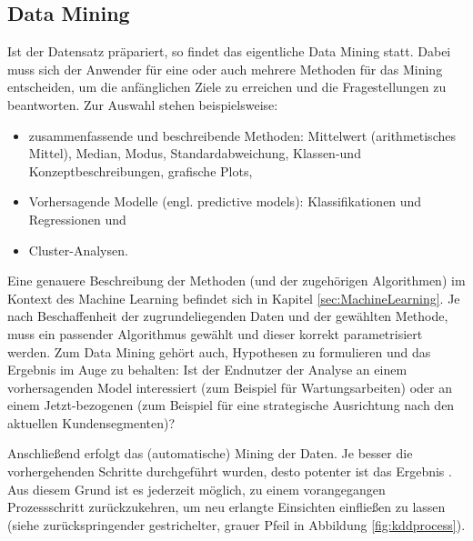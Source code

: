 \subsection{Data Mining}\label{subsubsec:DataMining}
Ist der Datensatz präpariert, so findet das eigentliche Data Mining statt. Dabei muss sich der Anwender für eine oder auch mehrere Methoden für das Mining entscheiden, um die anfänglichen Ziele zu erreichen und die Fragestellungen zu beantworten. Zur Auswahl stehen beispielsweise:
\begin{itemize}
\item zusammenfassende und beschreibende Methoden: Mittelwert (arithmetisches Mittel), Median, Modus, Standardabweichung, Klassen-und Konzeptbeschreibungen, grafische Plots,
\item Vorhersagende Modelle (engl. predictive models): Klassifikationen und Regressionen und
\item Cluster-Analysen.
\end{itemize}
Eine genauere Beschreibung der Methoden (und der zugehörigen Algorithmen) im Kontext des Machine Learning befindet sich in Kapitel \ref{sec:MachineLearning}. Je nach Beschaffenheit der zugrundeliegenden Daten und der gewählten Methode, muss ein passender Algorithmus gewählt und dieser korrekt parametrisiert werden. Zum Data Mining gehört auch, Hypothesen zu formulieren und das Ergebnis im Auge zu behalten: Ist der Endnutzer der Analyse an einem vorhersagenden Model interessiert (zum Beispiel für Wartungsarbeiten) oder an einem Jetzt-bezogenen (zum Beispiel für eine strategische Ausrichtung nach den aktuellen Kundensegmenten)?\par
Anschließend erfolgt das (automatische) Mining der Daten. Je besser die vorhergehenden Schritte durchgeführt wurden, desto potenter ist das Ergebnis \citep[S.~42]{fayyad_data_1996}. Aus diesem Grund ist es jederzeit möglich, zu einem vorangegangen Prozessschritt zurückzukehren, um neu erlangte Einsichten einfließen zu lassen (siehe zurückspringender gestrichelter, grauer Pfeil in Abbildung \ref{fig:kddprocess}).

